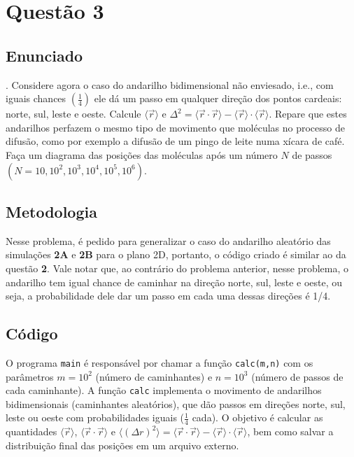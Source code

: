 
\chapter*{Questão 3}

\section*{Enunciado}
. Considere agora o caso do andarilho bidimensional não enviesado, i.e., com iguais chances $\left(\frac{1}{4}\right)$ ele dá um passo em qualquer direção dos pontos cardeais: norte, sul, leste e oeste. Calcule $\langle \vec{r} \rangle$ e 
$\Delta^2 = \langle \vec{r} \cdot \vec{r} \rangle - \langle \vec{r} \rangle \cdot \langle \vec{r} \rangle$.
Repare que estes andarilhos perfazem o mesmo tipo de movimento que moléculas no processo de difusão, como por exemplo a difusão de um pingo de leite numa xícara de café. Faça um diagrama das posições das moléculas após um número $N$ de passos 
$(N = 10, 10^2, 10^3, 10^4, 10^5, 10^6)$.

\section*{Metodologia}
Nesse problema, é pedido para generalizar o caso do andarilho aleatório das simulações \textbf{2A} e \textbf{2B} para o plano 2D, portanto, o código criado é similar ao da questão \textbf{2}. Vale notar que, ao contrário do problema anterior, nesse problema, o andarilho tem igual chance de caminhar na direção norte, sul, leste e oeste, ou seja, a probabilidade dele dar um passo em cada uma dessas direções é 1/4.

\section*{Código}
O programa \texttt{main} é responsável por chamar a função \texttt{calc(m,n)} com 
os parâmetros $m=10^2$ (número de caminhantes) e $n=10^3$ (número de passos de cada caminhante). 
A função \texttt{calc} implementa o movimento de andarilhos bidimensionais (caminhantes aleatórios), 
que dão passos em direções norte, sul, leste ou oeste com probabilidades iguais 
($\tfrac{1}{4}$ cada). O objetivo é calcular as quantidades 
$\langle \vec{r} \rangle$, $\langle \vec{r}\cdot \vec{r} \rangle$ e 
$\langle (\Delta r)^2 \rangle = \langle \vec{r}\cdot \vec{r} \rangle - \langle \vec{r}\rangle \cdot \langle \vec{r}\rangle$, 
bem como salvar a distribuição final das posições em um arquivo externo.  

